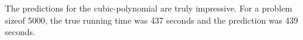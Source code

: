 \documentclass{article}
\begin{document}
The predictions for the cubic-polynomial are truly impressive.  For a problem sizeof 5000, the true running time was 437 seconds and the prediction was 439 seconds.
%
%
%
%
%
\end{document}
